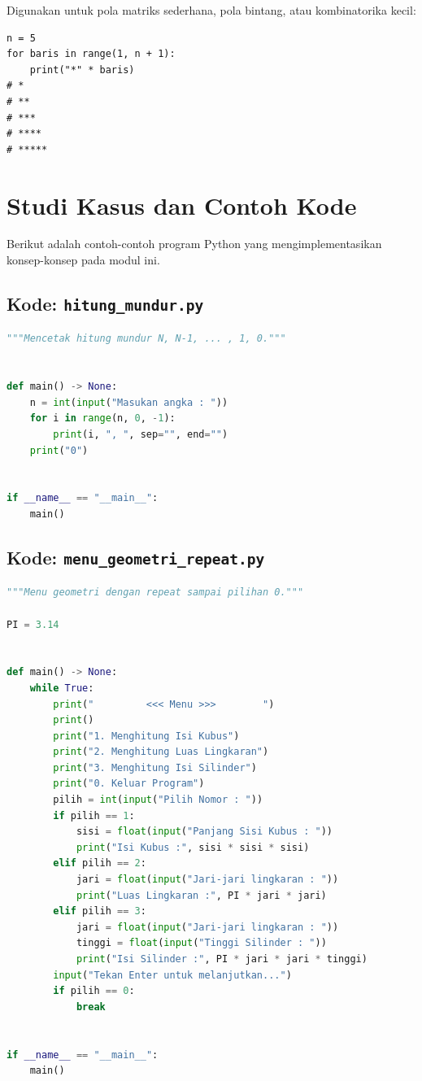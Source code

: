 ﻿\documentclass[../main.tex]{subfiles}
\begin{document}
Digunakan untuk pola matriks sederhana, pola bintang, atau kombinatorika kecil:

\begin{lstlisting}[caption=Pola bintang dengan loop bersarang]
n = 5
for baris in range(1, n + 1):
    print("*" * baris)
# *
# **
# ***
# ****
# *****
\end{lstlisting}

\section{Studi Kasus dan Contoh Kode}

Berikut adalah contoh-contoh program Python yang mengimplementasikan konsep-konsep pada modul ini.

\subsection{Kode: \texttt{hitung\_mundur.py}}
\begin{lstlisting}[language=Python,caption={\texttt{hitung\_mundur.py}}]
"""Mencetak hitung mundur N, N-1, ... , 1, 0."""


def main() -> None:
    n = int(input("Masukan angka : "))
    for i in range(n, 0, -1):
        print(i, ", ", sep="", end="")
    print("0")


if __name__ == "__main__":
    main()
\end{lstlisting}

\subsection{Kode: \texttt{menu\_geometri\_repeat.py}}
\begin{lstlisting}[language=Python,caption={\texttt{menu\_geometri\_repeat.py}}]
"""Menu geometri dengan repeat sampai pilihan 0."""

PI = 3.14


def main() -> None:
    while True:
        print("         <<< Menu >>>        ")
        print()
        print("1. Menghitung Isi Kubus")
        print("2. Menghitung Luas Lingkaran")
        print("3. Menghitung Isi Silinder")
        print("0. Keluar Program")
        pilih = int(input("Pilih Nomor : "))
        if pilih == 1:
            sisi = float(input("Panjang Sisi Kubus : "))
            print("Isi Kubus :", sisi * sisi * sisi)
        elif pilih == 2:
            jari = float(input("Jari-jari lingkaran : "))
            print("Luas Lingkaran :", PI * jari * jari)
        elif pilih == 3:
            jari = float(input("Jari-jari lingkaran : "))
            tinggi = float(input("Tinggi Silinder : "))
            print("Isi Silinder :", PI * jari * jari * tinggi)
        input("Tekan Enter untuk melanjutkan...")
        if pilih == 0:
            break


if __name__ == "__main__":
    main()
\end{lstlisting}
\end{document}
